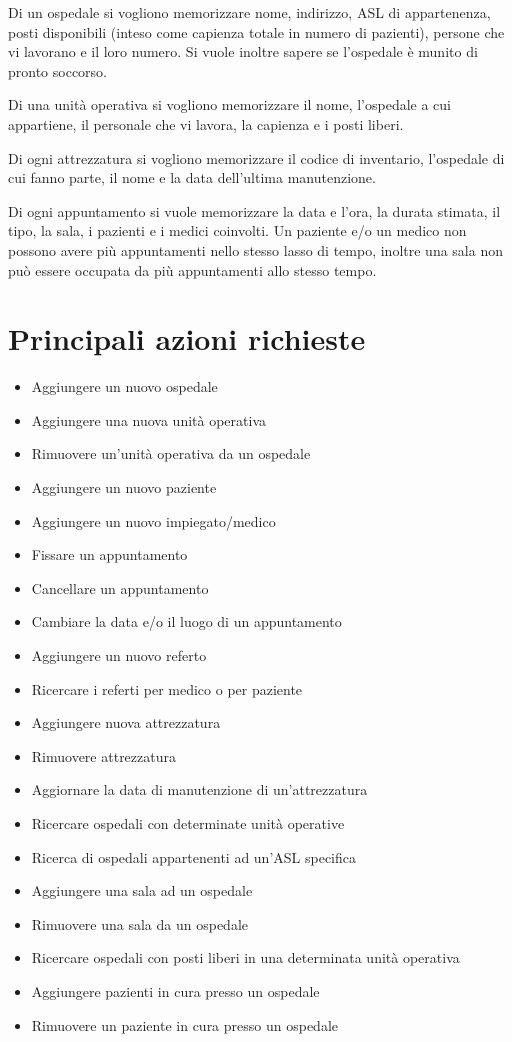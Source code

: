 \documentclass[a4paper,12pt]{report}
\begin{document}
Di un ospedale si vogliono memorizzare nome, indirizzo, ASL di appartenenza, posti disponibili (inteso come capienza totale in numero di pazienti),
persone che vi lavorano e il loro numero. Si vuole inoltre sapere se l'ospedale è munito di pronto soccorso.

Di una unità operativa si vogliono memorizzare il nome, l'ospedale a cui appartiene, il personale che vi lavora, la capienza e i posti liberi.

Di ogni attrezzatura si vogliono memorizzare il codice di inventario, l'ospedale di cui fanno parte, il nome e la data dell'ultima manutenzione.

Di ogni appuntamento si vuole memorizzare la data e l'ora, la durata stimata, il tipo, la sala, i pazienti e i medici coinvolti. 
Un paziente e/o un medico non possono avere più appuntamenti nello stesso lasso di tempo, inoltre una sala non può essere occupata da più 
appuntamenti allo stesso tempo.
\section{Principali azioni richieste}
\begin{itemize}
  \item Aggiungere un nuovo ospedale
  \item Aggiungere una nuova unità operativa
  \item Rimuovere un'unità operativa da un ospedale
  \item Aggiungere un nuovo paziente
  \item Aggiungere un nuovo impiegato/medico
  \item Fissare un appuntamento
  \item Cancellare un appuntamento
  \item Cambiare la data e/o il luogo di un appuntamento
  \item Aggiungere un nuovo referto
  \item Ricercare i referti per medico o per paziente
  \item Aggiungere nuova attrezzatura
  \item Rimuovere attrezzatura
  \item Aggiornare la data di manutenzione di un'attrezzatura
  \item Ricercare ospedali con determinate unità operative
  \item Ricerca di ospedali appartenenti ad un'ASL specifica
  \item Aggiungere una sala ad un ospedale
  \item Rimuovere una sala da un ospedale
  \item Ricercare ospedali con posti liberi in una determinata unità operativa
  \item Aggiungere pazienti in cura presso un ospedale
  \item Rimuovere un paziente in cura presso un ospedale
\end{itemize}
\end{document}
